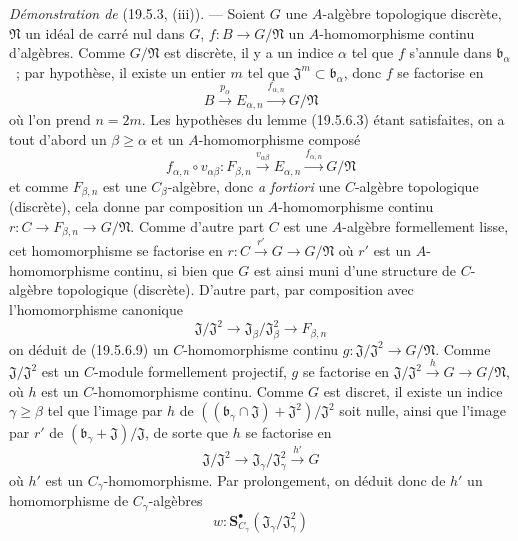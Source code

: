 \begin{env}[19.5.6.8]
\label{0.19.5.6.8-fr}
\emph{Démonstration de} (19.5.3, (iii)). --- Soient $G$ une $A$-algèbre
topologique discrète, $\mathfrak N$ un idéal de carré nul dans $G$,
$f:B\to G/\mathfrak N$ un $A$-homomorphisme continu d'algèbres. Comme
$G/\mathfrak N$ est discrète, il y a un indice $\alpha$ tel que $f$ s'annule
dans $\mathfrak b_\alpha$~; par hypothèse, il existe un entier $m$ tel que
$\mathfrak J^m\subset\mathfrak b_\alpha$, donc $f$ se factorise en
\[
  B\xrightarrow{p_\alpha}E_{\alpha,n}
  \xrightarrow{f_{\alpha,n}}G/\mathfrak N
\]
où l'on prend $n=2m$. Les hypothèses du lemme (19.5.6.3) étant satisfaites, on
a tout d'abord un $\beta\geq\alpha$ et un $A$-homomorphisme composé
\begin{equation}
\label{0.19.5.6.9-fr}
  f_{\alpha,n}\circ v_{\alpha\beta}:F_{\beta,n}
  \xrightarrow{v_{\alpha\beta}}E_{\alpha,n}
  \xrightarrow{f_{\alpha,n}}G/\mathfrak N
  \tag{19.5.6.9}
\end{equation}
et comme $F_{\beta,n}$ est une $C_\beta$-algèbre, donc \emph{a fortiori} une
$C$-algèbre topologique (discrète), cela donne par composition un
$A$-homomorphisme continu
$r:C\to F_{\beta,n}\to G/\mathfrak N$. Comme d'autre part $C$ est une
$A$-algèbre formellement lisse,
cet homomorphisme se factorise en
$r:C\xrightarrow{r'}G\to G/\mathfrak N$ où $r'$ est un
$A$-homomorphisme continu, si bien que $G$ est ainsi muni d'une structure de
$C$-algèbre topologique (discrète). D'autre part, par composition avec
l'homomorphisme canonique
\[
  \mathfrak J/\mathfrak J^2\longrightarrow
  \mathfrak J_\beta/\mathfrak J_\beta^2\longrightarrow F_{\beta,n}
\]
on déduit de (19.5.6.9) un $C$-homomorphisme continu
$g:\mathfrak J/\mathfrak J^2\to G/\mathfrak N$. Comme
$\mathfrak J/\mathfrak J^2$ est un $C$-module formellement projectif, $g$ se
factorise en
$\mathfrak J/\mathfrak J^2\xrightarrow{h}G\to G/\mathfrak N$, où $h$ est un $C$-homomorphisme continu. Comme $G$ est discret, il existe un
indice $\gamma\geq\beta$ tel que l'image par $h$ de
$((\mathfrak b_\gamma\cap\mathfrak J)+\mathfrak J^2)/\mathfrak J^2$ soit
nulle, ainsi que l'image par $r'$ de
$(\mathfrak b_\gamma+\mathfrak J)/\mathfrak J$, de sorte que $h$ se factorise
en
\[
  \mathfrak J/\mathfrak J^2\longrightarrow
  \mathfrak J_\gamma/\mathfrak J_\gamma^2
  \xrightarrow{h'}G
\]
où $h'$ est un $C_\gamma$-homomorphisme. Par prolongement, on déduit donc de
$h'$ un homomorphisme de $C_\gamma$-algèbres
\[
  w:\mathbf S_{C_\gamma}^\bullet(\mathfrak J_\gamma/\mathfrak J_\gamma^2)
\]
\end{env}
